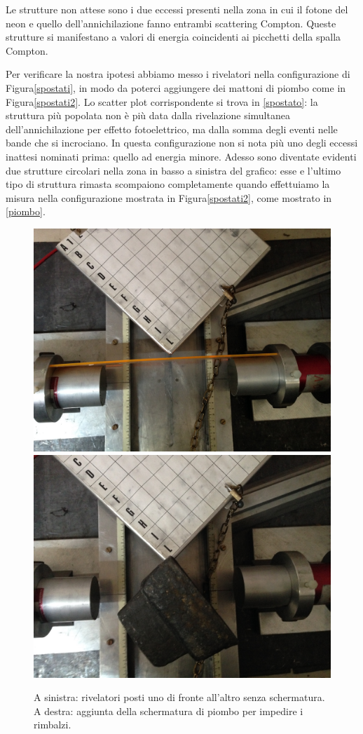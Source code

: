 
Le strutture non attese sono i due eccessi presenti nella zona in cui il fotone del neon e quello dell'annichilazione fanno entrambi scattering Compton. Queste strutture si manifestano a valori di energia coincidenti ai picchetti della spalla Compton.

Per verificare la nostra ipotesi abbiamo messo i rivelatori nella configurazione di Figura\autoref{spostati}, in modo da poterci aggiungere dei mattoni di piombo come in Figura\autoref{spostati2}. 
Lo scatter plot corrispondente si trova in \autoref{spostato}: la struttura più popolata non è più data dalla rivelazione simultanea dell'annichilazione per effetto fotoelettrico, ma dalla somma degli eventi nelle bande che si incrociano.
In questa configurazione non si nota più uno degli eccessi inattesi nominati prima: quello ad energia minore. Adesso sono diventate evidenti due strutture circolari nella zona in basso a sinistra del grafico: esse e l'ultimo tipo di struttura rimasta scompaiono completamente quando effettuiamo la misura nella configurazione mostrata in Figura\autoref{spostati2}, come mostrato in \autoref{piombo}.

\begin{figure}[h]
\centering
\subfloat
{\includegraphics[width=17 em]{immagini/alter} \label{spostati} }
\subfloat
{\includegraphics[width=17 em]{immagini/spostati2} \label{spostati2}}
\caption{A sinistra: rivelatori posti uno di fronte all'altro senza schermatura. A destra: aggiunta della schermatura di piombo per impedire i rimbalzi.}
\end{figure}

